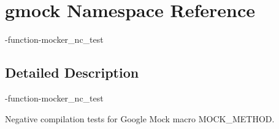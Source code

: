 \hypertarget{namespacegmock}{}\section{gmock Namespace Reference}
\label{namespacegmock}


-\/function-\/mocker\+\_\+nc\+\_\+test  




\subsection{Detailed Description}
-\/function-\/mocker\+\_\+nc\+\_\+test 

\begin{DoxyVerb}Negative compilation tests for Google Mock macro MOCK_METHOD.\end{DoxyVerb}
 